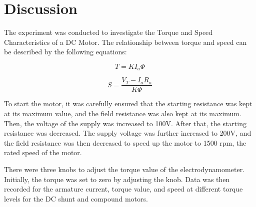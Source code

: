 \documentclass[a4paper,12pt]{article}
\begin{document}
\section{Discussion}

The experiment was conducted to investigate the Torque and Speed Characteristics of a DC Motor. The relationship between torque and speed can be described by the following equations:

\begin{equation}
	T = K I_a \Phi
\end{equation}

\[
S = \frac{V_T - I_a R_a}{K \Phi}
\]

To start the motor, it was carefully ensured that the starting resistance was kept at its maximum value, and the field resistance was also kept at its maximum. Then, the voltage of the supply was increased to 100V. After that, the starting resistance was decreased. The supply voltage was further increased to 200V, and the field resistance was then decreased to speed up the motor to 1500 rpm, the rated speed of the motor.

There were three knobs to adjust the torque value of the electrodynamometer. Initially, the torque was set to zero by adjusting the knob. Data was then recorded for the armature current, torque value, and speed at different torque levels for the DC shunt and compound motors.

	
\end{document}
